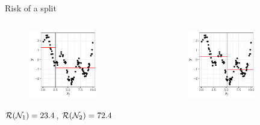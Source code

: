 \documentclass[11pt,compress,t,notes=noshow, xcolor=table]{beamer}
\begin{document}
\begin{vbframe}{Risk of a split}

\begin{columns}
\begin{column}{0.5\textwidth}


\begin{figure}
\includegraphics[width=0.7\textwidth]{figure/splitcrit_optimal-constant-sub1.pdf} 
\end{figure}

$\mathcal{R}(\mathcal{N}_1) = 23.4$, $\mathcal{R}(\mathcal{N}_2) = 72.4$ 
 
\end{column}
\begin{column}{0.5\textwidth}

\begin{figure}
\includegraphics[width=0.7\textwidth]{figure/splitcrit_optimal-constant-sub2.pdf} 
\end{figure}


\end{column}
\end{columns}
\end{vbframe}
\end{document}

